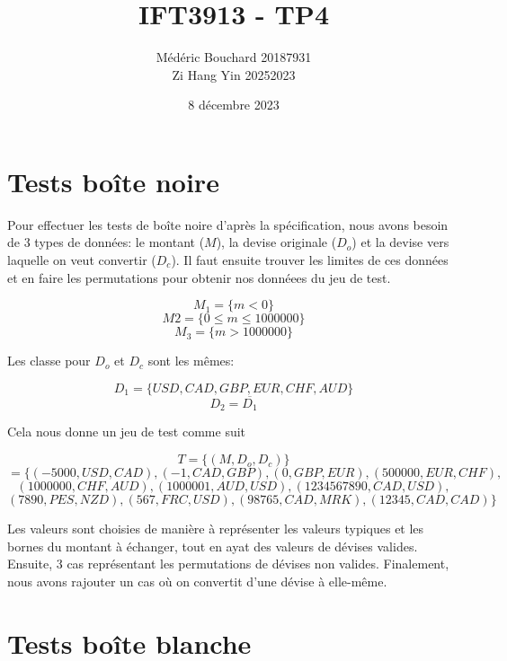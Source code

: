 \documentclass{article}
\author{Médéric Bouchard 20187931\\
Zi Hang Yin 20252023}
\date{8 décembre 2023}
\title{IFT3913 - TP4}
\begin{document}
\maketitle

\section{Tests boîte noire}

Pour effectuer les tests de boîte noire d'après la spécification, nous avons besoin de 3 types de données: le montant ($M$), la devise originale ($D_o$) et la devise vers laquelle on veut convertir ($D_c$).
Il faut ensuite trouver les limites de ces données et en faire les permutations pour obtenir nos donnéees du jeu de test.

$$M_1 = \{m < 0\}$$
$$M2 = \{0 \leq m \leq 1 000 000\}$$
$$M_3 = \{m > 1 000 000\}$$

Les classe pour $D_o$ et $D_c$ sont les mêmes:

$$D_1 = \{USD, CAD, GBP, EUR, CHF, AUD\}$$
$$D_2 = \overline{D_1}$$

Cela nous donne un jeu de test comme suit

$$T = \{(M, D_o, D_c)\}$$
$$= \{(-5000, USD, CAD), (-1, CAD, GBP), (0, GBP, EUR), (500000, EUR, CHF),$$
$$(1000000, CHF, AUD), (1000001, AUD, USD), (1234567890, CAD, USD),$$
$$(7890, PES, NZD), (567, FRC, USD), (98765, CAD, MRK), (12345, CAD, CAD)\}$$

Les valeurs sont choisies de manière à représenter les valeurs typiques et les bornes du montant à échanger, tout en ayat des valeurs de dévises valides.
Ensuite, 3 cas représentant les permutations de dévises non valides.
Finalement, nous avons rajouter un cas où on convertit d'une dévise à elle-même.

\section{Tests boîte blanche}
\end{document}
